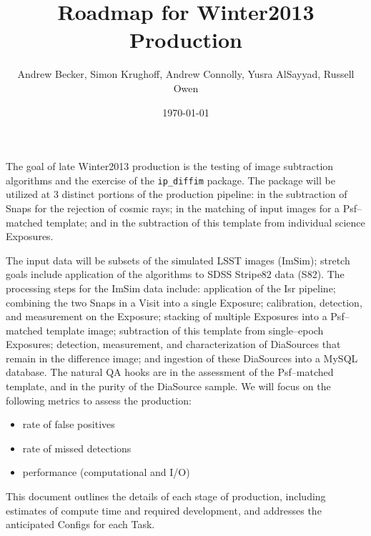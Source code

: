 \documentclass[12pt]{article}
\author{Andrew Becker, Simon Krughoff, Andrew Connolly, Yusra AlSayyad, Russell Owen}
\title{Roadmap for Winter2013 Production}
\date{\today}
\begin{document}
\maketitle

The goal of late Winter2013 production is the testing of image
subtraction algorithms and the exercise of the {\tt ip\_diffim}
package.  The package will be utilized at 3 distinct portions of the
production pipeline: in the subtraction of Snaps for the rejection of
cosmic rays; in the matching of input images for a Psf--matched
template; and in the subtraction of this template from individual
science Exposures.

The input data will be subsets of the simulated LSST images (ImSim);
stretch goals include application of the algorithms to SDSS Stripe82
data (S82).  The processing steps for the ImSim data include:
application of the Isr pipeline; combining the two Snaps in a Visit
into a single Exposure; calibration, detection, and measurement on the
Exposure; stacking of multiple Exposures into a Psf--matched template
image; subtraction of this template from single--epoch Exposures;
detection, measurement, and characterization of DiaSources that remain
in the difference image; and ingestion of these DiaSources into a
MySQL database.  The natural QA hooks are in the assessment of the
Psf--matched template, and in the purity of the DiaSource sample.  We
will focus on the following metrics to assess the production:
\begin{itemize}
\item rate of false positives
\item rate of missed detections
\item performance (computational and I/O)
\end{itemize}
This document outlines the details of each stage of production, 
including estimates of compute time and required development, and addresses the anticipated
Configs for each Task.

\clearpage
\tableofcontents
\clearpage

\end{document}
